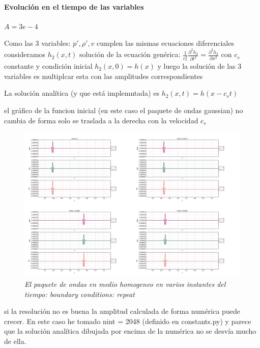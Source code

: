 \documentclass{article}
\begin{document}
\paragraph{Evolución en el tiempo de las variables}
\begin{description}
\item $A = 3e-4$
\item Como las 3 variables: $p\prime, \rho\prime, v$  cumplen las mismas ecuaciones diferenciales consideramos $h_2(x,t)$ solución de la ecuación genérica:   
 $\frac{1}{c_s^{2}} \frac{\partial^{2} h_2}{\partial t^{2}} = \frac{ \partial^{2} h_2}{\partial x^2}   $ con $c_s$ constante  y condición inicial $h_2(x,0) = h(x)$
y luego la solución de las 3 variables es multiplcar esta con las amplitudes correspondientes

\item La solución analítica (y que está implemntada) es
$h_2(x,t) = h(x - c_s t)$
\item el gráfico de la  funcion inicial (en este caso el paquete de ondas gaussian) no cambia de forma solo se traslada a la derecha con la velocidad $c_s$

\begin{figure}[!ht]
 \centering
 \includegraphics[scale=0.2]{mainhom.png}
 \caption{\emph{El paquete de ondas en medio homogeneo en varios instantes del tiempo: boundary conditions: repeat}}
\end{figure}

\item si la resolución no es buena la amplitud calculada de forma numérica puede crecer. En este caso he tomado nint = 2048 (definido en constants.py)
y parece que la solución analítica dibujada por encima de la numérica no se desvía mucho de ella.
\end{description}
\end{document}
